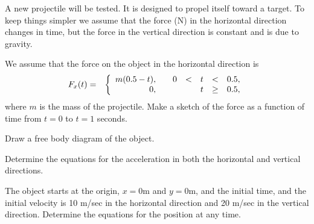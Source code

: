 
\begin{problem}
\item
\end{problem}


\begin{problem}
\item A new projectile will be tested. It is designed to propel itself
  toward a target. To keep things simpler we assume that the force (N)
  in the horizontal direction changes in time, but the force in the
  vertical direction is constant and is due to gravity.
  \begin{subproblem}
    \item We assume that the force on the object in the horizontal
      direction is 
      \begin{eqnarray*}
        F_x(t) & = & \left\{
                     \begin{array}{r@{\hspace{2em}}rcccl}
                       m(0.5-t), & 0 & < & t & < & 0.5, \\
                       0,        &   &   & t & \geq & 0.5,
                     \end{array}
                     \right.
      \end{eqnarray*}
      where $m$ is the mass of the projectile.
      Make a sketch of the force as a function of time from $t=0$ to
      $t=1$ seconds. 
      \vfill

    \item Draw a free body diagram of the object.
      \vfill

    \item Determine the equations for the acceleration in both the
      horizontal and vertical directions.

      \vfill

      \clearpage

    \item The object starts at the origin, $x=0$m and $y=0$m, and the
      initial time, and the initial velocity is 10 m/sec in the
      horizontal direction and 20 m/sec in the vertical
      direction. Determine the equations for the position at any time.

      \vfill


\end{subproblem}
\end{problem}

